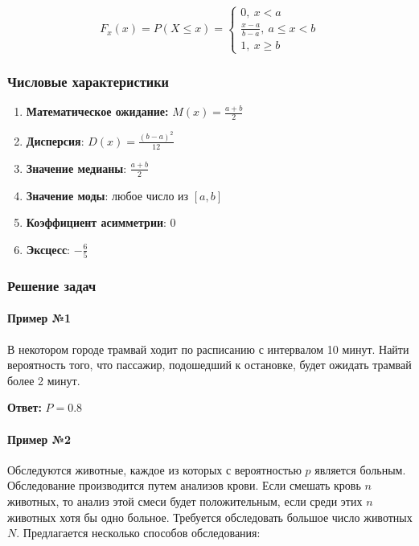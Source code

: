 \documentclass{article}
\begin{document}
$$F_x(x) = P(X \le x) = \begin{cases}
    0, \ x < a \\
    \frac{x - a}{b - a}, \ a \le x < b \\
    1, \ x \ge b
\end{cases}$$

\subsubsection{Числовые характеристики}

\begin{multicols}{2}
    \begin{enumerate}
        \item \textbf{Математическое ожидание:} $M(x) = \frac{a + b}{2}$
        \item \textbf{Дисперсия}: $D(x) = \frac{(b - a)^2}{12}$
        \item \textbf{Значение медианы}: $\frac{a + b}{2}$
        \item \textbf{Значение моды}: любое число из $[a, b]$
        \item \textbf{Коэффициент асимметрии}: $0$
        \item \textbf{Эксцесс}: $-\frac{6}{5}$
    \end{enumerate}    
\end{multicols}

\subsubsection{Решение задач}

\paragraph{Пример №1} В некотором городе трамвай ходит по расписанию с интервалом 10 минут. Найти вероятность того, что пассажир, подошедший к остановке, будет ожидать трамвай более 2 минут.

\textbf{Ответ:} $P = 0.8$

\paragraph{Пример №2} Обследуются животные, каждое из которых с вероятностью $p$ является больным. Обследование производится путем анализов крови. Если смешать кровь $n$ животных, то анализ этой смеси будет положительным, если среди этих $n$ животных хотя бы одно больное. Требуется обследовать большое число животных $N$. Предлагается несколько способов обследования:
\end{document}
